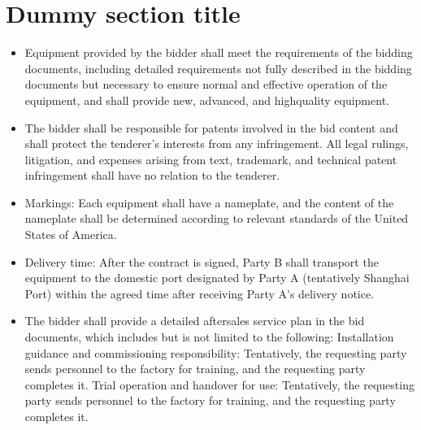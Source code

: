 \documentclass[a4paper,10pt,english,openany,oneside]{sphinxmanual}
\begin{document}
\section{Dummy section title}
\label{\detokenize{section2_requirements:dummy-section-title}}\begin{itemize}
\item {} 
\sphinxAtStartPar
Equipment provided by the bidder shall meet the requirements of the bidding documents, including detailed requirements not fully described in the bidding documents but necessary to ensure normal and effective operation of the equipment, and shall provide new, advanced, and high\sphinxhyphen{}quality equipment.

\item {} 
\sphinxAtStartPar
The bidder shall be responsible for patents involved in the bid content and shall protect the tenderer’s interests from any infringement. All legal rulings, litigation, and expenses arising from text, trademark, and technical patent infringement shall have no relation to the tenderer.

\item {} 
\sphinxAtStartPar
Markings: Each equipment shall have a nameplate, and the content of the nameplate shall be determined according to relevant standards of the United States of America.

\item {} 
\sphinxAtStartPar
Delivery time: After the contract is signed, Party B shall transport the equipment to the domestic port designated by Party A (tentatively Shanghai Port) within the agreed time after receiving Party A’s delivery notice.

\item {} 
\sphinxAtStartPar
The bidder shall provide a detailed after\sphinxhyphen{}sales service plan in the bid documents, which includes but is not limited to the following: Installation guidance and commissioning responsibility: Tentatively, the requesting party sends personnel to the factory for training, and the requesting party completes it. Trial operation and handover for use: Tentatively, the requesting party sends personnel to the factory for training, and the requesting party completes it.

\end{itemize}
\end{document}
